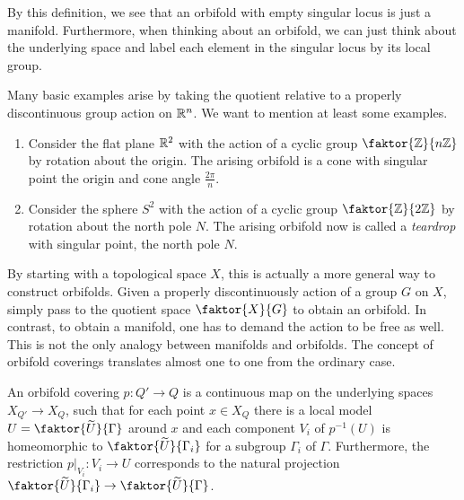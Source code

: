 By this definition, we see that an orbifold with empty singular locus is just a manifold.
Furthermore, when thinking about an orbifold, we can just think about the underlying space and label each element in the singular locus by its local group.

Many basic examples arise by taking the quotient relative to a properly discontinuous group action on \(\mathbb{R}^n\).
We want to mention at least some examples.

\begin{example} %
    \begin{enumerate}
        \item Consider the flat plane \(\mathbb{R}^2\) with the action of a cyclic group \(\faktor{\Z}{n\Z}\) by rotation about the origin.
            The arising orbifold is a cone with singular point the origin and cone angle \(\frac{2\pi}{n}\).
        
        \item Consider the sphere \(S^2\) with the action of a cyclic group \(\faktor{\Z}{2\Z}\) by rotation about the north pole \(N\).
            The arising orbifold now is called a \emph{teardrop} with singular point, the north pole \(N\).
            
    \end{enumerate}
\end{example}

By starting with a topological space \(X\), this is actually a more general way to construct orbifolds.
Given a properly discontinuously action of a group \(G\) on \(X\), simply pass to the quotient space \(\faktor{X}{G}\) to obtain an orbifold.
In contrast, to obtain a manifold, one has to demand the action to be free as well.
This is not the only analogy between manifolds and orbifolds.
The concept of orbifold coverings translates almost one to one from the ordinary case.

\begin{definition}
    An orbifold covering \(p: Q' \to Q\) is a continuous map on the underlying spaces \(X_{Q'} \to X_Q\), such that for each point \(x \in X_Q\) there is a local model \(U = \faktor{\widetilde{U}}{\Gamma}\) around \(x\) and each component \(V_i\) of \(p^{-1}(U)\) is homeomorphic to \(\faktor{\widetilde{U}}{\Gamma_i}\) for a subgroup \(\Gamma_i\) of \(\Gamma\).
    Furthermore, the restriction \(p\vert_{V_i} : V_i \to U\) corresponds to the natural projection \(\faktor{\widetilde{U}}{\Gamma_i} \to \faktor{\widetilde{U}}{\Gamma}\).
\end{definition}

